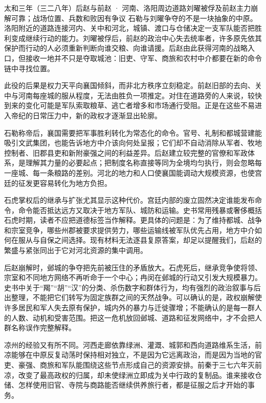 \begin{event}{}{太和三年（三二八年）}{后赵与前赵 · 河南、洛阳周边道路}{刘曜被俘及前赵主力崩解可靠；战场位置、兵数和败因有争议}
石勒与刘曜争夺的不是一块抽象的中原。洛阳附近的道路连接河内、关中和河北，城镇、渡口与仓储决定一支军队能否把胜利变成继续行动的能力。刘曜被俘后，前赵的政治中心失去统率者，许多原先依其保护而行动的人必须重新判断向谁交粮、向谁请援。后赵由此获得河南的战略入口，但接收一地并不只是夺取城池：旧吏、守军、商旅和农村中介都要在新的命令链中寻找位置。

此役的后果是权力天平向襄国倾斜，而非北方秩序立刻稳定。前赵旧部的去向、关中与河南每座城的服从程度，无法由胜负一项推定。对住在道路旁的人来说，较快到来的变化可能是军队索取粮草、逃亡者增多和市场通行受阻。正是在这些不易进入帝纪的日常压力中，新的政权才逐渐显出轮廓。
\end{event}

石勒称帝后，襄国需要把军事胜利转化为常态化的命令。官号、礼制和都城营建能吸引文武集团，也能告诉地方中介该向何处呈报；它们却不自动消除从军者、牧地控制者、旧郡县吏和新附豪强之间的利益差异。后赵建立较完整的官僚和军政体系，是理解其力量的必要起点；把制度名称直接等同为全境均匀执行，则会忽略每一座城、每一条粮路的差别。河北的地力和人口使襄国能调动大规模资源，也使宫廷的征发更容易转化为地方负担。

石虎掌权后的继承与扩张尤其显示这种代价。宫廷内部的废立固然决定谁能发布命令，命令能否抵达远方又取决于地方军队、城防和运输。史书常用残暴或奢侈概括石虎时期，读者不应把道德标签当作解释。更具体的问题是：为了维持都城、战争和宗室竞争，哪些州郡被要求提供劳力，哪些运输线被军队优先占用，地方中介如何在服从与自保之间选择。现有材料无法逐县复原答案，却足以提醒我们，后赵的繁盛与紧张同出于它对河北资源的集中调用。

后赵崩解时，邺城的争夺把先前被压住的矛盾放大。石虎死后，继承竞争使将领、宗室和不同地方网络不再听命于一个中心；冉闵在邺城的行动又引发大规模暴力。史书中关于“羯”“胡”“汉”的分类、杀伤数字和群体行为，均有强烈的政治叙事与后出整理，不能把它们转写为固定族群之间的天然战争。可以确认的是，政权崩解使许多居民和军人失去原有保护，城内外的暴力与迁徙骤增；不能确认的是每一群人的人数、动机和受害范围。把这一危机放回邺城、道路和征发网络中，才不会把人群名称误作完整解释。

凉州的经验又有所不同。河西走廊依靠绿洲、灌溉、城郭和西向道路维系生活，前凉能够在中原反复动荡时保持相对独立，不是因为它远离政治，而是因为当地的官吏、豪强、商旅和军队能围绕这些节点形成自己的资源安排。前秦于三七六年灭前凉，改变了最高政权的归属，却未使绿洲立即成为关中行政的复制品。谁来接收仓储、怎样使用旧官、寺院与商路能否继续供养旅行者，都是征服之后才开始的事务。

